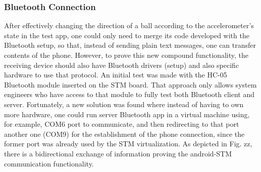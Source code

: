 \subsubsection{Bluetooth Connection}%
\label{sec:bluetooth-connection}
After effectively changing the direction of a ball according to the accelerometer's state in the test app, one could only need to merge its code developed with the Bluetooth setup, so that, instead of sending plain text messages, one can transfer contents of the phone.
%
However, to prove this new compound functionality, the receiving device should also have Bluetooth drivers (setup) and also specific hardware to use that protocol.
%
An initial test was made with the HC-05 Bluetooth module inserted on the STM board. That approach only allows system engineers who have access to that module to fully test both Bluetooth client and server. 
%
Fortunately, a new solution was found where instead of having to own more hardware, one could run server Bluetooth app in a virtual machine using, for example, COM6 port to communicate, and then redirecting to that port another one (COM9) for the establishment of the phone connection, since the former port was already used by the STM virtualization.
%
As depicted in Fig. zz, there is a bidirectional exchange of information proving the android-STM communication functionality.
%
